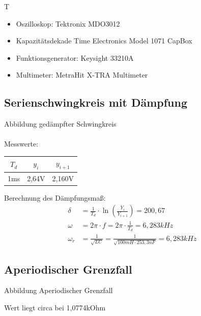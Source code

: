 \documentclass{article}
\begin{document}
\begin{devlist}
  T
  \begin{itemize}
    \item Oszilloskop: Tektronix MDO3012
    \item Kapazitätsdekade Time Electronics Model 1071 CapBox
    \item Funktionsgenerator: Keysight 33210A
    \item Multimeter: MetraHit X-TRA Multimeter
  \end{itemize}
\end{devlist}

\subsection{Serienschwingkreis mit Dämpfung}

Abbildung gedämpfter Schwingkreis\\\\

Messwerte:
\begin{table}[h]
  \begin{center}

    \begin{tabular}{|c|c|c|}
      \hline
      $T_d$ & $y_i$ & $y_{i+1}$ \\
      \hline
      1ms   & 2,64V & 2,160V    \\
      \hline
    \end{tabular}
  \end{center}
\end{table}
Berechnung des Dämpfungsmaß:
\begin{align*}
  \delta   & = \frac{1}{T_d} \cdot \ln \left(\frac{Y_i}{Y_{i+1}}\right) = 200,67      \\
  \omega   & = 2\pi \cdot f = 2\pi \cdot \frac{1}{T_d} = 6,283kHz                     \\
  \omega_r & = \frac{1}{\sqrt{LC}} = \frac{1}{\sqrt{100mH \cdot 253,3nF}} = 6,283 kHz
\end{align*}


\subsection{Aperiodischer Grenzfall}

Abbildung Aperiodischer Grenzfall

Wert liegt circa bei 1,0774kOhm
\end{document}
